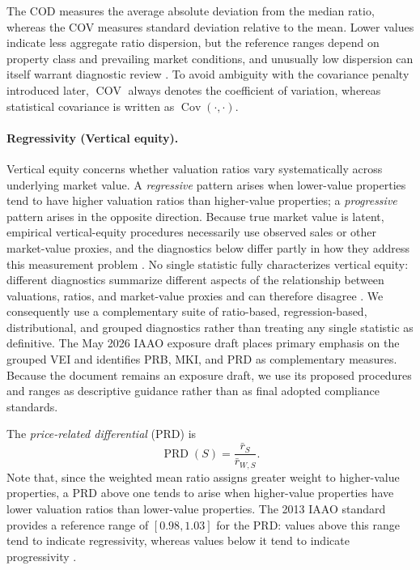 \documentclass[10pt]{article}
\theoremstyle{definition}
\newcommand{\1}{\mathbf{1}}
\begin{document}
{The COD measures the average absolute deviation from the median ratio, whereas the COV measures standard deviation relative to the mean. Lower values indicate less aggregate ratio dispersion, but the reference ranges depend on property class and prevailing market conditions, and unusually low dispersion can itself warrant diagnostic review \cite{IAAO2013Ratio,IAAO2026ExposureRatio}.}
To avoid ambiguity with the covariance penalty introduced later, $\operatorname{COV}$ always denotes the coefficient of variation, whereas statistical covariance is written as $\operatorname{Cov}(\cdot,\cdot)$.

\paragraph{Regressivity (Vertical equity).}
{Vertical equity concerns whether valuation ratios vary systematically across underlying market value. A \emph{regressive} pattern arises when lower-value properties tend to have higher valuation ratios than higher-value properties; a \emph{progressive} pattern arises in the opposite direction. Because true market value is latent, empirical vertical-equity procedures necessarily use observed sales or other market-value proxies, and the diagnostics below differ partly in how they address this measurement problem \cite{IAAO2026ExposureRatio}. No single statistic fully characterizes vertical equity: different diagnostics summarize different aspects of the relationship between valuations, ratios, and market-value proxies and can therefore disagree \cite{IAAO2023VerticalReview,IAAO2026ExposureRatio}. We consequently use a complementary suite of ratio-based, regression-based, distributional, and grouped diagnostics rather than treating any single statistic as definitive. The May 2026 IAAO exposure draft places primary emphasis on the grouped VEI and identifies PRB, MKI, and PRD as complementary measures. Because the document remains an exposure draft, we use its proposed procedures and ranges as descriptive guidance rather than as final adopted compliance standards.}

The \emph{price-related differential} (PRD) is
\begin{equation}
\label{eq:prd}
\operatorname{PRD}(S)
=
\frac{\bar r_S}{\bar r_{W,S}}.
\end{equation}
Note that, since the weighted mean ratio assigns greater weight to higher-value properties, a PRD above one tends to arise when higher-value properties have lower valuation ratios than lower-value properties. The 2013 IAAO standard provides a reference range of $[0.98,1.03]$ for the PRD: values above this range tend to indicate regressivity, whereas values below it tend to indicate progressivity \cite{IAAO2013Ratio}.
\end{document}
